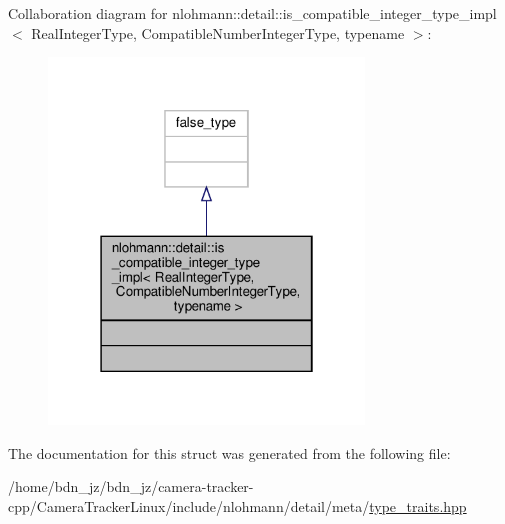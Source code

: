 Collaboration diagram for nlohmann\+:\+:detail\+:\+:is\+\_\+compatible\+\_\+integer\+\_\+type\+\_\+impl$<$ Real\+Integer\+Type, Compatible\+Number\+Integer\+Type, typename $>$\+:
\nopagebreak
\begin{figure}[H]
\begin{center}
\leavevmode
\includegraphics[width=238pt]{structnlohmann_1_1detail_1_1is__compatible__integer__type__impl__coll__graph}
\end{center}
\end{figure}


The documentation for this struct was generated from the following file\+:\begin{DoxyCompactItemize}
\item 
/home/bdn\+\_\+jz/bdn\+\_\+jz/camera-\/tracker-\/cpp/\+Camera\+Tracker\+Linux/include/nlohmann/detail/meta/\hyperlink{type__traits_8hpp}{type\+\_\+traits.\+hpp}\end{DoxyCompactItemize}
